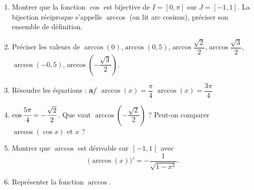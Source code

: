 
\begin{exercice}\label{exostarterST-0011}


\begin{enumerate}
\item Montrer que la fonction $\cos$ est bijective de $I=[0,\pi]$ sur $J=[-1,1]$. La bijection réciproque s'appelle $\arccos$ (on lit arc cosinus), préciser son ensemble de définition.
\item Préciser les valeurs de $\arccos(0)$,\quad $\arccos(0,5)$,\quad $\arccos\dfrac{\sqrt2}2$,\quad $\arccos\dfrac{\sqrt3}2$,\quad $\arccos(-0,5)$,\quad $\arccos(-\dfrac{\sqrt{3}}2)$.
\item Résoudre  les équations : {\bfseries  a/} $\arccos (x) = \dfrac{\pi}{4}$    $\arccos (x) = \dfrac{3\pi}{4}$
\item $\cos \cfrac{5\pi}4=-\dfrac{\sqrt2}2$. Que vaut $\arccos(-\dfrac{\sqrt{2}}2)$ ? Peut-on comparer $\arccos(\cos x)$ et $x$ ?
\item Montrer que $\arccos$ est dérivable sur $\mathopen] -1 , 1 \mathclose[$ avec
			\begin{equation}
				\big( \arccos(x) \big)'=-\frac{ 1 }{ \sqrt{1-x^2} }.
			\end{equation}
\item Représenter la fonction $\arccos$. 
\end{enumerate}


\end{exercice}
